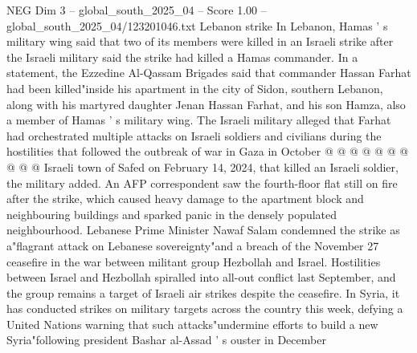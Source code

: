 \begin{textsample}{NEG Dim 3 – global\_south\_2025\_04 – Score 1.00 – global\_south\_2025\_04/123201046.txt}
Lebanon strike In Lebanon, Hamas ' s military wing said that two of its members were killed in an Israeli strike after the Israeli military said the strike had killed a Hamas commander.
In a statement, the Ezzedine Al-Qassam Brigades said that commander Hassan Farhat had been killed"inside his apartment in the city of Sidon, southern Lebanon, along with his martyred daughter Jenan Hassan Farhat, and his son Hamza, also a member of Hamas ' s military wing.
The Israeli military alleged that Farhat had orchestrated multiple attacks on Israeli soldiers and civilians during the hostilities that followed the outbreak of war in Gaza in October @ @ @ @ @ @ @ @ @ @ Israeli town of Safed on February 14, 2024, that killed an Israeli soldier, the military added.
An AFP correspondent saw the fourth-floor flat still on fire after the strike, which caused heavy damage to the apartment block and neighbouring buildings and sparked panic in the densely populated neighbourhood.
Lebanese Prime Minister Nawaf Salam condemned the strike as a"flagrant attack on Lebanese sovereignty"and a breach of the November 27 ceasefire in the war between militant group Hezbollah and Israel.
Hostilities between Israel and Hezbollah spiralled into all-out conflict last September, and the group remains a target of Israeli air strikes despite the ceasefire.
In Syria, it has conducted strikes on military targets across the country this week, defying a United Nations warning that such attacks"undermine efforts to build a new Syria"following president Bashar al-Assad ' s ouster in December

\end{textsample}
